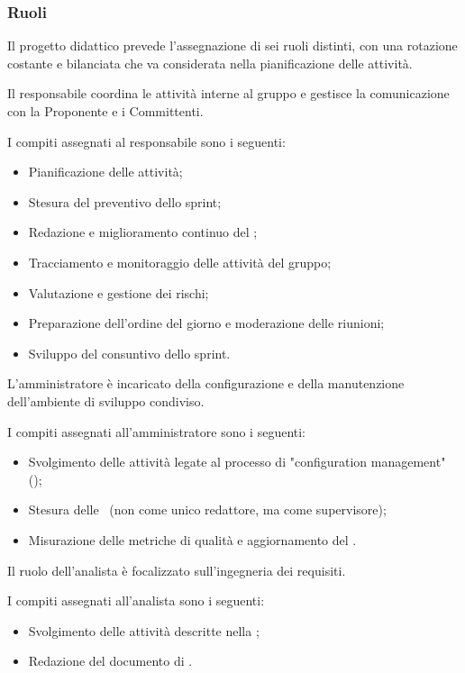 \subsubsection{Ruoli}
\par Il progetto didattico prevede l'assegnazione di sei ruoli distinti, con una rotazione costante e bilanciata che va considerata nella pianificazione delle attività.

\par Il responsabile coordina le attività interne al gruppo e gestisce la comunicazione con la Proponente e i Committenti.
\par I compiti assegnati al responsabile sono i seguenti:
\begin{itemize}
  \item Pianificazione delle attività;
  \item Stesura del preventivo dello sprint;
  \item Redazione e miglioramento continuo del \PdP;
  \item Tracciamento e monitoraggio delle attività del gruppo;
  \item Valutazione e gestione dei rischi;
  \item Preparazione dell'ordine del giorno e moderazione delle riunioni;
  \item Sviluppo del consuntivo dello sprint.
\end{itemize}

\par L'amministratore è incaricato della configurazione e della manutenzione dell'ambiente di sviluppo condiviso.
\par I compiti assegnati all'amministratore sono i seguenti:
\begin{itemize}
  \item Svolgimento delle attività legate al processo di "configuration management" ();
  \item Stesura delle \NdP\ (non come unico redattore, ma come supervisore);
  \item Misurazione delle metriche di qualità e aggiornamento del \PdQ.
\end{itemize}

\par Il ruolo dell'analista è focalizzato sull'ingegneria dei requisiti.
\par I compiti assegnati all'analista sono i seguenti:
\begin{itemize}
  \item Svolgimento delle attività descritte nella ;
  \item Redazione del documento di \AdR.
\end{itemize}

